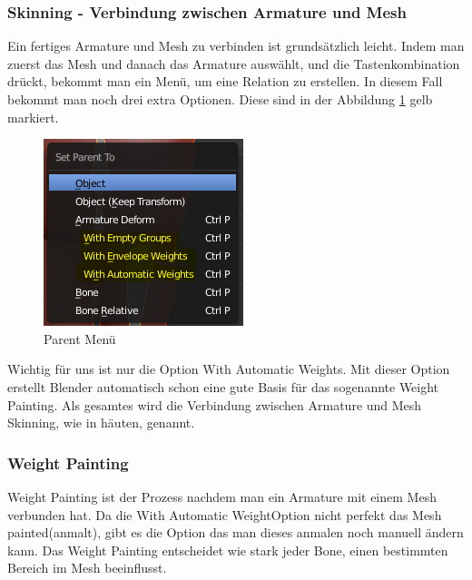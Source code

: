 \subsubsection{Skinning - Verbindung zwischen Armature und Mesh}
Ein fertiges Armature und Mesh zu verbinden ist grundsätzlich leicht. Indem man zuerst das Mesh und danach das Armature auswählt, und die Tastenkombination  drückt,
bekommt man ein Menü, um eine Relation zu erstellen. In diesem Fall bekommt man noch drei extra Optionen. Diese sind in der Abbildung \ref{rigging:parentmenu} gelb markiert.

\begin{figure}[H]
    \centering

    \includegraphics[width=.8\textwidth]{images/rigging_connecting_arm_and_mesh.PNG}
    \caption{Parent Menü}
    \label{rigging:parentmenu}
\end{figure}

Wichtig für uns ist nur die Option \dq With Automatic Weights\dq. Mit dieser Option erstellt Blender automatisch schon eine gute Basis für das sogenannte \dq Weight Painting\dq.
Als gesamtes wird die Verbindung zwischen Armature und Mesh \dq Skinning\dq, wie in häuten, genannt.

\subsubsection{Weight Painting}
Weight Painting ist der Prozess nachdem man ein Armature mit einem Mesh verbunden hat. Da die \dq With Automatic Weight\dq Option nicht perfekt das Mesh \dq painted\dq (anmalt),
gibt es die Option das man dieses anmalen noch manuell ändern kann. Das Weight Painting entscheidet wie stark jeder Bone, einen bestimmten Bereich im Mesh beeinflusst.

